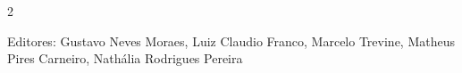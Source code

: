 \documentclass[11pt,a4paper]{article}
\begin{document}
\sloppy

\newcommand{\edicaoMes}{AGOSTO}
\newcommand{\edicaoAno}{2026}





\begin{multicols}{2}

% 



% 




{\color{gray}
Editores:
Gustavo Neves Moraes, Luiz Claudio Franco, Marcelo Trevine, Matheus Pires Carneiro, Nathália Rodrigues Pereira
}

\end{multicols}
\end{document}
